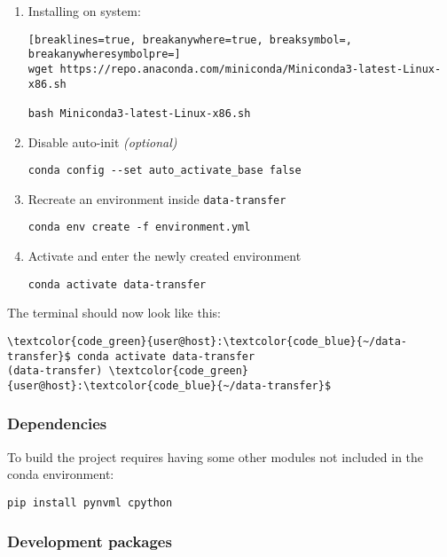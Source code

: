 \documentclass[a4paper,onecolumn]{article}
\begin{document}
\begin{enumerate}
    \item Installing on system:
\begin{Verbatim}[breaklines=true, breakanywhere=true, breaksymbol=, breakanywheresymbolpre=]
wget https://repo.anaconda.com/miniconda/Miniconda3-latest-Linux-x86.sh

bash Miniconda3-latest-Linux-x86.sh
\end{Verbatim}

    \item Disable auto-init \textit{(optional)}

\begin{verbatim}
conda config --set auto_activate_base false
\end{verbatim}

    \item Recreate an environment inside \verb|data-transfer|

\begin{verbatim}
conda env create -f environment.yml
\end{verbatim}

    \item Activate and enter the newly created environment
    
\begin{verbatim}
conda activate data-transfer
\end{verbatim}

\end{enumerate}

The terminal should now look like this:
\begin{Verbatim}[commandchars=\\\{\}]
\textcolor{code_green}{user@host}:\textcolor{code_blue}{~/data-transfer}$ conda activate data-transfer
(data-transfer) \textcolor{code_green}{user@host}:\textcolor{code_blue}{~/data-transfer}$
\end{Verbatim}

\subsubsection{Dependencies}

To build the project requires having some other modules not included in the conda environment:

\begin{verbatim}
pip install pynvml cpython
\end{verbatim}

\subsubsection{Development packages}
\end{document}
